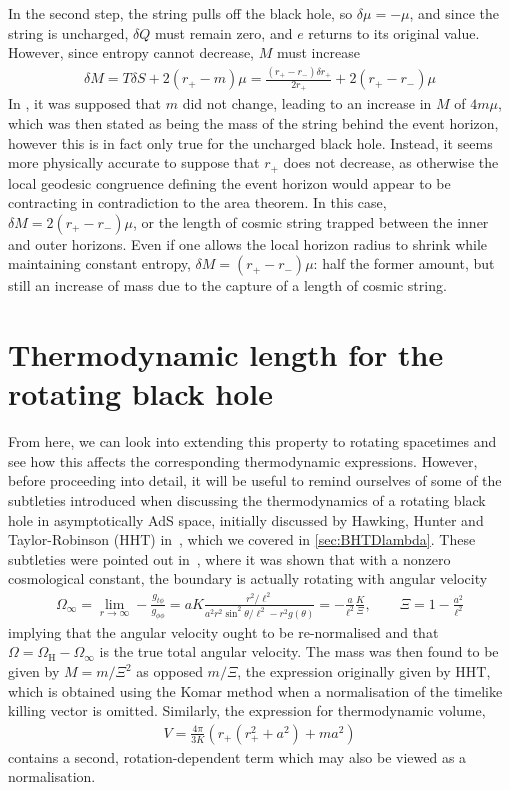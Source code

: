 \documentclass[
twoside,
openright,
frontopenright,
]{dmathesis}
\begin{document}
In the second step, the string pulls off the black hole, so $\delta \mu = -\mu$,
and since the string is uncharged, $\delta Q$ must remain zero, and $e$ 
returns to its original value. However, since entropy cannot decrease, 
$M$ must increase
\begin{align}
\delta M = T\delta S + 2(r_+-m)\mu
= \frac{(r_+-r_-) \delta r_+}{2r_+} + 2(r_+-r_-)\mu 
\end{align}
In \cite{Bonjour:1998rf}, it was supposed that $m$ did not change, leading to an
increase in $M$ of $4m\mu$, which was then stated as being the mass of the
string behind the event horizon, however this is in fact only true for the
uncharged black hole. Instead, it seems more physically accurate to suppose that
$r_+$ does not decrease, as otherwise the local geodesic congruence defining the
event horizon would appear to be contracting in contradiction to the area
theorem.  In this case, $\delta M = 2 (r_+-r_-) \mu$, or the length of cosmic
string trapped between the inner and outer horizons. Even if one allows the
local horizon radius to shrink while maintaining constant entropy,
$\delta M = (r_+ - r_-)\mu$: half the former amount, but still an increase of
mass due to the capture of a length of cosmic string.

\section{Thermodynamic length for the rotating black hole}
\label{sec:therm-length-rotat}

From here, we can look into extending this property to rotating spacetimes and
see how this affects the corresponding thermodynamic expressions. However,
before proceeding into detail, it will be useful to remind ourselves of some of
the subtleties introduced when discussing the thermodynamics of a rotating black
hole in asymptotically AdS space, initially discussed by Hawking, Hunter and
Taylor-Robinson (HHT) in~\cite{Hawking:1998kw}, which we covered in
\cref{sec:BHTDlambda}. These subtleties were pointed out
in~\cite{Caldarelli:1999xj,Gibbons:2004ai}, where it was shown that with a
nonzero cosmological constant, the boundary is actually rotating with angular
velocity
\begin{align}
\Omega_\infty = \lim_{r\to\infty} -\frac{g_{t\phi}}{g_{\phi\phi}} = aK
  \frac{r^2/\ell^2}{a^2 r^2 \sin^2\theta/\ell^2- r^2 g(\theta)} = -
  \frac{a}{\ell^2} \frac{K}{\Xi}, \qquad \Xi = 1-\frac{a^2}{\ell^2}
\end{align}
implying that the angular velocity ought to be re-normalised and that
$\Omega = \Omega_\mathrm{H} - \Omega_\infty$ is the true total angular
velocity. The mass was then found to be given by $M=m/\Xi^2$ as opposed $m/\Xi$,
the expression originally given by HHT, which is obtained using the Komar method
when a normalisation of the timelike killing vector is omitted. Similarly, the
expression for thermodynamic volume,
\begin{align}
  \label{eq:volKerrAdS}
V = \frac{4\pi}{3K} \left( r_+(r_+^2+a^2) + ma^2 \right)
\end{align}
contains a second, rotation-dependent term which may also be viewed as a
normalisation.
\end{document}
